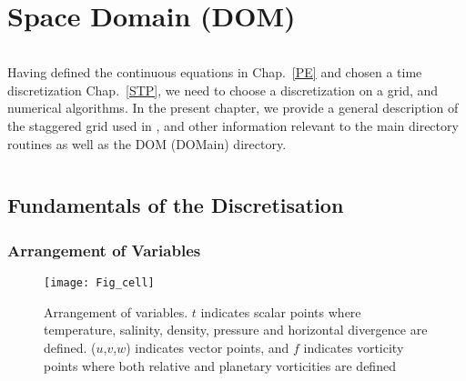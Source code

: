 \documentclass[NEMO_book]{subfiles}
\begin{document}
\chapter{Space Domain (DOM) }
\label{DOM}
\minitoc



\newpage
$\ $\newline    %

Having defined the continuous equations in Chap.~\ref{PE} and chosen a time 
discretization Chap.~\ref{STP}, we need to choose a discretization on a grid, 
and numerical algorithms. In the present chapter, we provide a general description 
of the staggered grid used in \NEMO, and other information relevant to the main 
directory routines as well as the DOM (DOMain) directory. 

$\ $\newline    %

\section{Fundamentals of the Discretisation}
\label{DOM_basics}

\subsection{Arrangement of Variables}
\label{DOM_cell}

\begin{figure}[!tb]    \begin{center}
\texttt{[image: Fig\_cell]}
\caption{ \label{Fig_cell}    
Arrangement of variables. $t$ indicates scalar points where temperature, 
salinity, density, pressure and horizontal divergence are defined. ($u$,$v$,$w$) 
indicates vector points, and $f$ indicates vorticity points where both relative and 
planetary vorticities are defined}
\end{center}   \end{figure}
\end{document}
